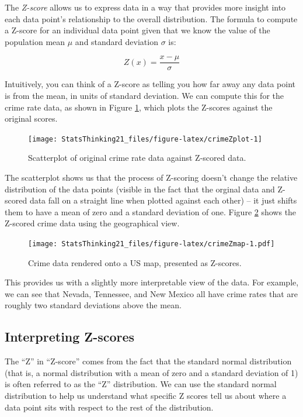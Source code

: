 \documentclass[
  12pt,
]{book}
\begin{document}
The \emph{Z-score} allows us to express data in a way that provides more insight into each data point's relationship to the overall distribution. The formula to compute a Z-score for an individual data point given that we know the value of the population mean \(\mu\) and standard deviation \(\sigma\) is:

\[
Z(x) = \frac{x - \mu}{\sigma}
\]

Intuitively, you can think of a Z-score as telling you how far away any data point is from the mean, in units of standard deviation. We can compute this for the crime rate data, as shown in Figure \ref{fig:crimeZplot}, which plots the Z-scores against the original scores.

\begin{figure}
\texttt{[image: StatsThinking21\_files/figure-latex/crimeZplot-1]} \caption{Scatterplot of original crime rate data against Z-scored data.}\label{fig:crimeZplot}
\end{figure}

The scatterplot shows us that the process of Z-scoring doesn't change the relative distribution of the data points (visible in the fact that the orginal data and Z-scored data fall on a straight line when plotted against each other) -- it just shifts them to have a mean of zero and a standard deviation of one. Figure \ref{fig:crimeZmap} shows the Z-scored crime data using the geographical view.

\begin{figure}
\centering
\texttt{[image: StatsThinking21\_files/figure-latex/crimeZmap-1.pdf]}
\caption{\label{fig:crimeZmap}Crime data rendered onto a US map, presented as Z-scores.}
\end{figure}

This provides us with a slightly more interpretable view of the data. For example, we can see that Nevada, Tennessee, and New Mexico all have crime rates that are roughly two standard deviations above the mean.

\hypertarget{interpreting-z-scores}{%
\subsection{Interpreting Z-scores}\label{interpreting-z-scores}}

The ``Z'' in ``Z-score'' comes from the fact that the standard normal distribution (that is, a normal distribution with a mean of zero and a standard deviation of 1) is often referred to as the ``Z'' distribution. We can use the standard normal distribution to help us understand what specific Z scores tell us about where a data point sits with respect to the rest of the distribution.
\end{document}

